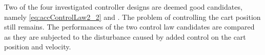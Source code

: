 %
Two of the four investigated controller designs are deemed good candidates, namely \autoref{eq:accControlLaw2_2} and . The problem of controlling the cart position still remains. The performances of the two control law candidates are compared as they are subjected to the disturbance caused by added control on the cart position and velocity.
%
%

